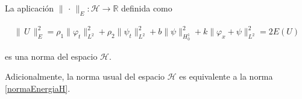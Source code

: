 \begin{Proposicion}
    \label{ch:teoriaVigas:prop:NormaEnergia}

    La aplicación $\lVert \, \cdot \, \rVert_{E} : \mathcal{H} \rightarrow \mathbb{R}$ definida como

    \begin{align}
        \label{normaEnergiaH}
        \lVert \, U \, \rVert^2_{E} = \rho_1 \lVert \varphi_t \rVert^2_{L^2} + \rho_2 \lVert \psi_t \rVert_{L^2}^2 + b \lVert \psi \rVert_{H_0^1}^2 + k \lVert \varphi_x + \psi \rVert_{L^2}^2 = 2E(U)
    \end{align}
    
    es una norma del espacio $\mathcal{H}$.

    Adicionalmente, la norma usual del espacio $\mathcal{H}$ es equivalente a la norma \eqref{normaEnergiaH}.
\end{Proposicion}


